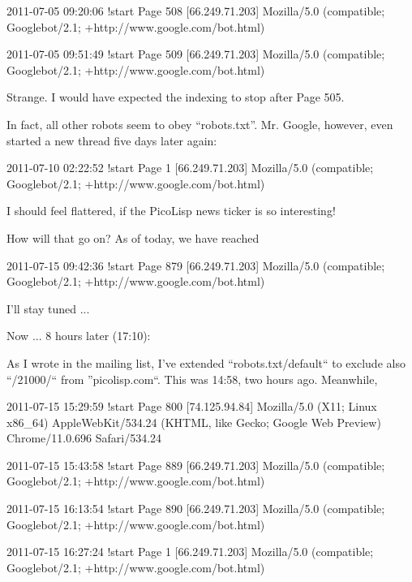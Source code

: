 \begin{wideverbatim}

  2011-07-05 09:20:06 {!start} Page 508 [66.249.71.203] Mozilla/5.0
  (compatible; Googlebot/2.1; +http://www.google.com/bot.html)

  2011-07-05 09:51:49 {!start} Page 509 [66.249.71.203] Mozilla/5.0
  (compatible; Googlebot/2.1; +http://www.google.com/bot.html)

\end{wideverbatim}

Strange. I would have expected the indexing to stop after Page 505.

In fact, all other robots seem to obey ``robots.txt''. Mr. Google, however, even
started a new thread five days later again:

\begin{wideverbatim}

  2011-07-10 02:22:52 {!start} Page 1 [66.249.71.203] Mozilla/5.0
  (compatible; Googlebot/2.1; +http://www.google.com/bot.html)

\end{wideverbatim}

I should feel flattered, if the PicoLisp news ticker is so interesting!

How will that go on? As of today, we have reached

\begin{wideverbatim}

  2011-07-15 09:42:36 {!start} Page 879 [66.249.71.203] Mozilla/5.0
  (compatible; Googlebot/2.1; +http://www.google.com/bot.html)

\end{wideverbatim}

I'll stay tuned ...

Now ... 8 hours later (17:10):

As I wrote in the mailing list, I've extended ``robots.txt/default`` to exclude
also ``/21000/`` from ''picolisp.com``. This was 14:58, two hours ago. Meanwhile,

\begin{wideverbatim}

  2011-07-15 15:29:59 {!start} Page 800 [74.125.94.84] Mozilla/5.0
  (X11; Linux x86_64) AppleWebKit/534.24 (KHTML, like Gecko; Google
  Web Preview) Chrome/11.0.696 Safari/534.24

  2011-07-15 15:43:58 {!start} Page 889 [66.249.71.203] Mozilla/5.0
  (compatible; Googlebot/2.1; +http://www.google.com/bot.html)

  2011-07-15 16:13:54 {!start} Page 890 [66.249.71.203] Mozilla/5.0
  (compatible; Googlebot/2.1; +http://www.google.com/bot.html)

  2011-07-15 16:27:24 {!start} Page 1 [66.249.71.203] Mozilla/5.0
  (compatible; Googlebot/2.1; +http://www.google.com/bot.html)

\end{wideverbatim}

